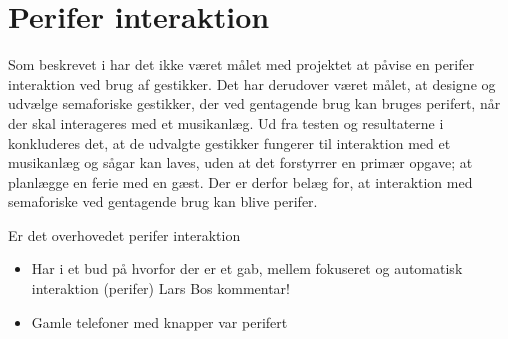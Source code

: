 \section{Perifer interaktion}
\label{DiskussionPeriferInteraktion}
%
Som beskrevet i  har det ikke været målet med projektet at påvise en perifer interaktion ved brug af gestikker. Det har derudover været målet, at designe og udvælge semaforiske gestikker, der ved gentagende brug kan bruges perifert, når der skal interageres med et musikanlæg. Ud fra testen og resultaterne i \fullref{\SocialAcceptpartname} konkluderes det, at de udvalgte gestikker fungerer til interaktion med et musikanlæg og sågar kan laves, uden at det forstyrrer en primær opgave; at planlægge en ferie med en gæst. Der er derfor belæg for, at interaktion med semaforiske ved gentagende brug kan blive perifer. 




Er det overhovedet perifer interaktion
%



\begin{itemize}
  \item Har i et bud på hvorfor der er et gab, mellem fokuseret og automatisk interaktion (perifer) Lars Bos kommentar!
  \item Gamle telefoner med knapper var perifert
\end{itemize}
%